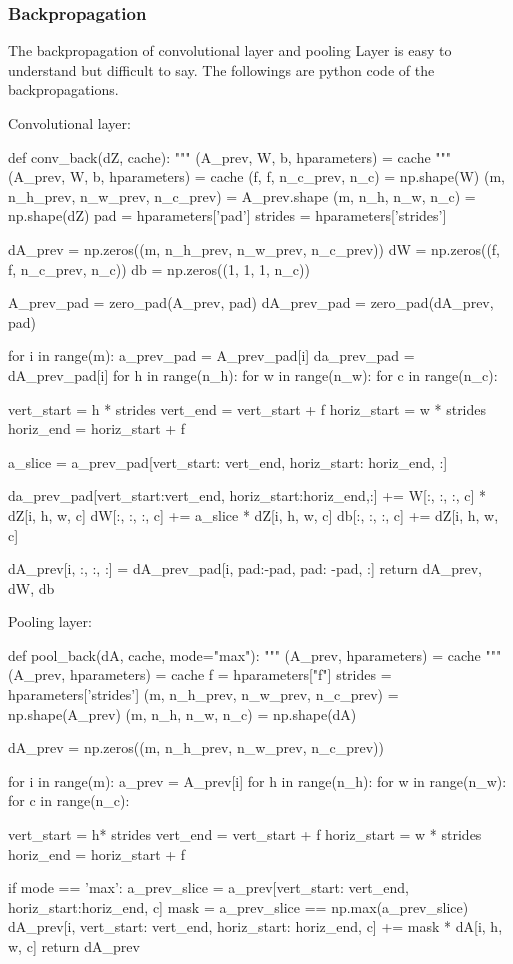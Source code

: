 \documentclass[10pt]{article}
\begin{document}
    \subsubsection*{Backpropagation}
    \begin{flushleft}
        The backpropagation of convolutional layer and pooling Layer is easy to understand but difficult to say. The followings are python code of the backpropagations.
    \end{flushleft}
    Convolutional layer:
    \begin{python}
def conv_back(dZ, cache):
    """
    (A_prev, W, b, hparameters) = cache
    """
    (A_prev, W, b, hparameters) = cache
    (f, f, n_c_prev, n_c) = np.shape(W)
    (m, n_h_prev, n_w_prev, n_c_prev) = A_prev.shape
    (m, n_h, n_w, n_c) = np.shape(dZ)
    pad = hparameters['pad']
    strides = hparameters['strides']

    dA_prev = np.zeros((m, n_h_prev, n_w_prev, n_c_prev))
    dW = np.zeros((f, f, n_c_prev, n_c))
    db = np.zeros((1, 1, 1, n_c))

    A_prev_pad = zero_pad(A_prev, pad)
    dA_prev_pad = zero_pad(dA_prev, pad)

    for i in range(m):
    a_prev_pad = A_prev_pad[i]
    da_prev_pad = dA_prev_pad[i]
    for h in range(n_h):
    for w in range(n_w):
    for c in range(n_c):

    vert_start = h * strides
    vert_end = vert_start + f
    horiz_start = w * strides
    horiz_end = horiz_start + f

    a_slice = a_prev_pad[vert_start: vert_end,
    horiz_start: horiz_end, :]

    da_prev_pad[vert_start:vert_end, horiz_start:horiz_end,:] += W[:, :, :, c] * dZ[i, h, w, c]
    dW[:, :, :, c] += a_slice * dZ[i, h, w, c]
    db[:, :, :, c] += dZ[i, h, w, c]

    dA_prev[i, :, :, :] = dA_prev_pad[i, pad:-pad, pad: -pad, :]
    return dA_prev, dW, db
    \end{python}
    Pooling layer:
    \begin{python}
def pool_back(dA, cache, mode="max"):
    """
    (A_prev, hparameters) = cache
    """
    (A_prev, hparameters) = cache
    f = hparameters["f"]
    strides = hparameters['strides']
    (m, n_h_prev, n_w_prev, n_c_prev) = np.shape(A_prev)
    (m, n_h, n_w, n_c) = np.shape(dA)

    dA_prev = np.zeros((m, n_h_prev, n_w_prev, n_c_prev))

    for i in range(m):
    a_prev = A_prev[i]
    for h in range(n_h):
    for w in range(n_w):
    for c in range(n_c):

    vert_start = h* strides
    vert_end = vert_start + f
    horiz_start = w * strides
    horiz_end = horiz_start + f

    if mode == 'max':
    a_prev_slice = a_prev[vert_start: vert_end,
    horiz_start:horiz_end, c]
    mask = a_prev_slice == np.max(a_prev_slice)
    dA_prev[i, vert_start: vert_end,
    horiz_start: horiz_end, c] += mask * dA[i, h, w, c]
    return dA_prev

    \end{python}
\end{document}
